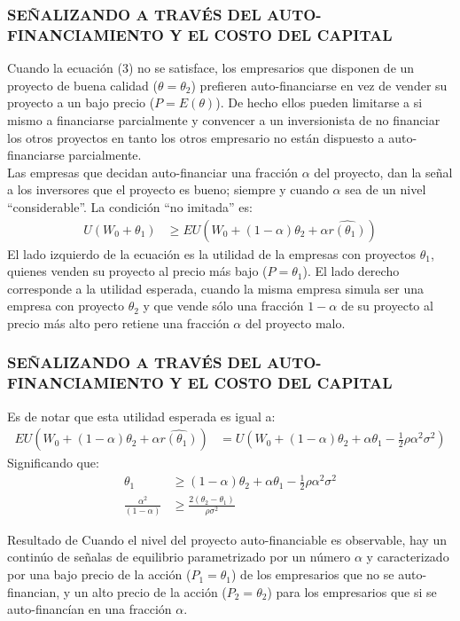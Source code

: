 \documentclass[10pt, xcolor=table, x11names]{beamer}
\begin{document}
\begin{frame}
    \frametitle{{\normalsize SEÑALIZANDO A TRAVÉS DEL AUTO-FINANCIAMIENTO Y EL COSTO DEL CAPITAL} {}}
    Cuando la ecuación (3) no se satisface, los empresarios que disponen de un proyecto de buena calidad ($\theta=\theta_{2}$) prefieren auto-financiarse en vez de vender su proyecto a un bajo precio ($P=E(\theta)$). De hecho ellos pueden limitarse a si mismo a financiarse parcialmente y convencer a un inversionista de no financiar los otros proyectos en tanto los otros empresario no están dispuesto a auto-financiarse parcialmente.\\
    Las empresas que decidan auto-financiar una fracción $\alpha$ del proyecto, dan la señal a los inversores que el proyecto es bueno; siempre y cuando $\alpha$ sea de un nivel   ``considerable''. La condición  ``no imitada'' es: 
       \begin{align}
      U(W_{0}+\theta_{1})&\geq EU(W_{0}+(1-\alpha)\theta_{2}+\alpha\hat{r(\theta_{1})}) 
      \end{align}  
    El lado izquierdo de la ecuación es la utilidad de la empresas con proyectos $\theta_{1}$, quienes venden su proyecto al precio más bajo ($P=\theta_{1}$). El lado derecho corresponde a la utilidad esperada, cuando la misma empresa simula ser una empresa con proyecto $\theta_{2}$ y que vende sólo una fracción $1-\alpha$ de su proyecto al precio más alto pero retiene una fracción $\alpha$ del proyecto malo. 
    
\end{frame}



\begin{frame}
    \frametitle{{\normalsize SEÑALIZANDO A TRAVÉS DEL AUTO-FINANCIAMIENTO Y EL COSTO DEL CAPITAL} {}}
    
    Es de notar que esta utilidad esperada es igual a:
    \begin{align}
    EU(W_{0}+(1-\alpha)\theta_{2}+\alpha\hat{r(\theta_{1})})&= U(W_{0}+(1-\alpha)\theta_{2}+\alpha\theta_{1}-\frac{1}{2}\rho \alpha^{2} \sigma^{2})
    \end{align}
    Significando que:
     \begin{align}
     \theta_{1}&\geq (1-\alpha)\theta_{2}+\alpha\theta_{1}-\frac{1}{2}\rho \alpha^{2} \sigma^{2} \nonumber \\
     \frac{\alpha^{2}}{(1-\alpha)}&\geq \frac{2(\theta_{2}-\theta_{1})}{\rho \sigma^{2}}
     \end{align} 
      \begin{block} {Resultado de \cite{Leland77}}
         Cuando el nivel del proyecto auto-financiable es observable, hay un continúo de señalas de equilibrio parametrizado por un número $\alpha$ y caracterizado por una bajo precio de la acción ($P_{1}=\theta_{1}$) de los empresarios que no se auto-financian, y un alto precio de la acción ($P_{2}=\theta_{2}$) para los empresarios que si se auto-financían en una fracción $\alpha$.\\      
     \end{block}	
     
      
     
\end{frame}
\end{document}
